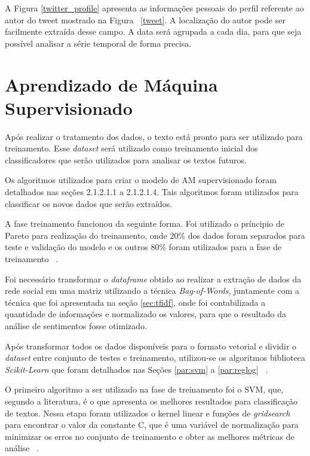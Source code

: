 A Figura \ref{twitter_profile} apresenta as informações pessoais do perfil referente ao autor do tweet mostrado na Figura ~\ref{tweet}. 
A localização do autor pode ser facilmente extraída desse campo. A data será agrupada a cada dia,
 para que seja possível analisar a série temporal de forma precisa.

%

\newpage

\section{Aprendizado de Máquina Supervisionado}
\label{sec:am}

Após realizar o tratamento dos dados, o texto está pronto para ser utilizado para treinamento. Esse \textit{dataset} será utilizado 
como treinamento inicial dos classificadores que serão utilizados para analisar os textos futuros.

Os algoritmos utilizados para criar o modelo de \acrshort{AM} supervisionado foram detalhados nas seções 2.1.2.1.1 a 2.1.2.1.4. Tais algoritmos foram utilizados para classificar os novos dados que serão extraídos.

A fase treinamento funcionou da seguinte forma. Foi utilizado o príncipio de Pareto para realização do treinamento, onde 20\% dos dados foram separados para teste e validação do
modelo e os outros 80\% foram utilizados para a fase de treinamento ~\cite{jin2008pareto}. 



Foi necessário transformar o \textit{dataframe} obtido ao realizar a extração de dados da rede social em uma matriz utilizando a técnica \textit{Bag-of-Words}, 
juntamente com a técnica que foi apresentada na seção \ref{sec:tfidf}, onde foi contabilizada a quantidade de informações e normalizado os valores, para 
que o resultado da análise de sentimentos fosse otimizado.


Após transformar todos os dados disponíveis para o formato vetorial e dividir o \textit{dataset} entre conjunto de testes e treinamento, utilizou-se
os algoritmos biblioteca \textit{Scikit-Learn} que foram detalhados nas Seções \ref{par:svm} a \ref{par:reglog}  ~\cite{pedregosa2011scikit}.


O primeiro algoritmo a ser utilizado na fase de treinamento foi o \acrshort{SVM}, que, segundo a literatura, é o que apresenta os melhores resultados para classificação de textos. 
Nessa etapa foram utilizados o kernel linear e funções de \textit{gridsearch} para encontrar o valor da constante C, 
que é uma variável de normalização para minimizar os erros no conjunto de treinamento e obter as melhores métricas de análise ~\cite{lorena2007introduccao}. 

